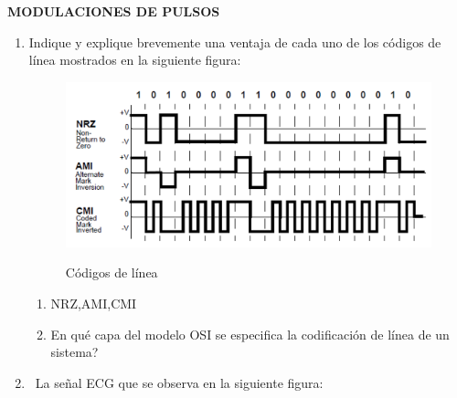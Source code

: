 \begin{enumerate}
\begin{enumerate}
		
		
	\end{enumerate}


\newpage


\begin{center}
	\textbf{MODULACIONES DE PULSOS}
	\\
	
\end{center}


\begin{enumerate}
	\item Indique y explique brevemente una ventaja de cada uno de los códigos de línea mostrados en la siguiente figura: 


\begin{figure}[h!]
	\captionsetup{justification = raggedright, singlelinecheck = false}
	\caption{Códigos de línea} 
	\centering
	\includegraphics[scale=0.4]{Imagenes/linecode.png}
	\label{fig:linecode}
\end{figure}
	\begin{enumerate}
		\item NRZ,AMI,CMI
		
		\item En qué capa del modelo OSI se especifica la codificación de línea de un sistema? 
	\end{enumerate}
	
	\item~La señal ECG que se observa en la siguiente figura:


\end{enumerate}
\end{enumerate}
